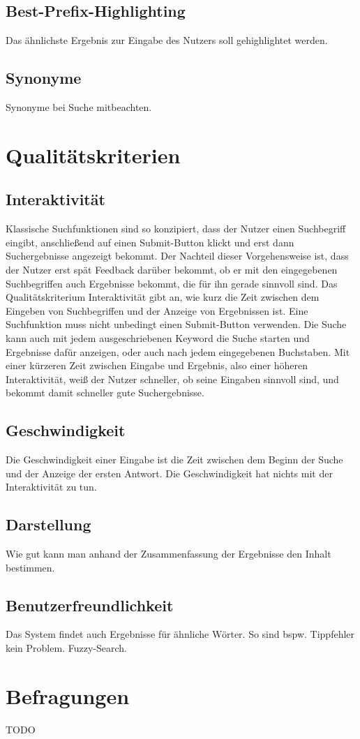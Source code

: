 \subsection*{Best-Prefix-Highlighting}
Das ähnlichste Ergebnis zur Eingabe des Nutzers soll gehighlightet werden.

\subsection*{Synonyme}
Synonyme bei Suche mitbeachten.

\section{Qualitätskriterien}

\subsection*{Interaktivität}
Klassische Suchfunktionen sind so konzipiert, dass der Nutzer einen Suchbegriff eingibt, anschließend auf einen Submit-Button klickt und erst dann Suchergebnisse angezeigt bekommt.
Der Nachteil dieser Vorgehensweise ist, dass der Nutzer erst spät Feedback darüber bekommt, ob er mit den eingegebenen Suchbegriffen auch Ergebnisse bekommt, die für ihn gerade sinnvoll sind.
Das Qualitätskriterium Interaktivität gibt an, wie kurz die Zeit zwischen dem Eingeben von Suchbegriffen und der Anzeige von Ergebnissen ist.
Eine Suchfunktion muss nicht unbedingt einen Submit-Button verwenden.
Die Suche kann auch mit jedem ausgeschriebenen Keyword die Suche starten und Ergebnisse dafür anzeigen, oder auch nach jedem eingegebenen Buchstaben.
Mit einer kürzeren Zeit zwischen Eingabe und Ergebnis, also einer höheren Interaktivität, weiß der Nutzer schneller, ob seine Eingaben sinnvoll sind, und bekommt damit schneller gute Suchergebnisse.

\subsection*{Geschwindigkeit}
Die Geschwindigkeit einer Eingabe ist die Zeit zwischen dem Beginn der Suche und der Anzeige der ersten Antwort.
Die Geschwindigkeit hat nichts mit der Interaktivität zu tun.


\subsection*{Darstellung}
Wie gut kann man anhand der Zusammenfassung der Ergebnisse den Inhalt bestimmen.

\subsection*{Benutzerfreundlichkeit}
Das System findet auch Ergebnisse für ähnliche Wörter.
So sind bspw. Tippfehler kein Problem.
Fuzzy-Search.

\section{Befragungen}
TODO